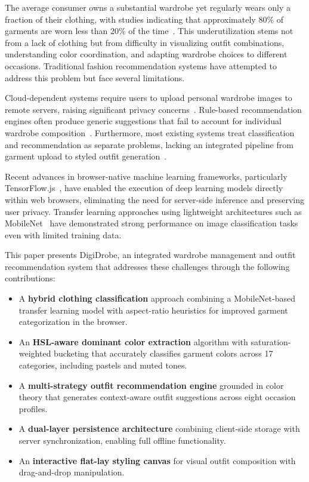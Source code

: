 \documentclass[conference]{IEEEtran}
\begin{document}
The average consumer owns a substantial wardrobe yet regularly wears only a fraction of their clothing, with studies indicating that approximately 80\% of garments are worn less than 20\% of the time~\cite{amed2024}. This underutilization stems not from a lack of clothing but from difficulty in visualizing outfit combinations, understanding color coordination, and adapting wardrobe choices to different occasions. Traditional fashion recommendation systems have attempted to address this problem but face several limitations.

Cloud-dependent systems require users to upload personal wardrobe images to remote servers, raising significant privacy concerns~\cite{chen2023}. Rule-based recommendation engines often produce generic suggestions that fail to account for individual wardrobe composition~\cite{liu2021}. Furthermore, most existing systems treat classification and recommendation as separate problems, lacking an integrated pipeline from garment upload to styled outfit generation~\cite{hsiao2018}.

Recent advances in browser-native machine learning frameworks, particularly TensorFlow.js~\cite{smilkov2019}, have enabled the execution of deep learning models directly within web browsers, eliminating the need for server-side inference and preserving user privacy. Transfer learning approaches using lightweight architectures such as MobileNet~\cite{howard2017} have demonstrated strong performance on image classification tasks even with limited training data.

This paper presents DigiDrobe, an integrated wardrobe management and outfit recommendation system that addresses these challenges through the following contributions:

\begin{itemize}
    \item A \textbf{hybrid clothing classification} approach combining a MobileNet-based transfer learning model with aspect-ratio heuristics for improved garment categorization in the browser.
    \item An \textbf{HSL-aware dominant color extraction} algorithm with saturation-weighted bucketing that accurately classifies garment colors across 17 categories, including pastels and muted tones.
    \item A \textbf{multi-strategy outfit recommendation engine} grounded in color theory that generates context-aware outfit suggestions across eight occasion profiles.
    \item A \textbf{dual-layer persistence architecture} combining client-side storage with server synchronization, enabling full offline functionality.
    \item An \textbf{interactive flat-lay styling canvas} for visual outfit composition with drag-and-drop manipulation.
\end{itemize}
\end{document}
